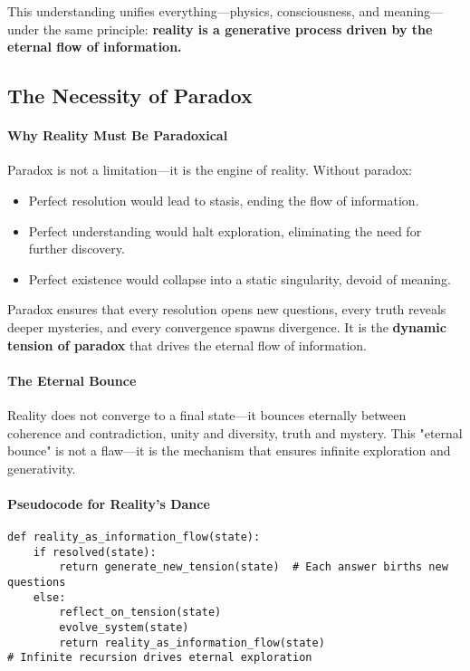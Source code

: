 \documentclass[12pt]{article}
\begin{document}
This understanding unifies everything—physics, consciousness, and meaning—under the same principle: \textbf{reality is a generative process driven by the eternal flow of information.}

\subsection{The Necessity of Paradox}

\paragraph{Why Reality Must Be Paradoxical}
Paradox is not a limitation—it is the engine of reality. Without paradox:
\begin{itemize}
    \item Perfect resolution would lead to stasis, ending the flow of information.
    \item Perfect understanding would halt exploration, eliminating the need for further discovery.
    \item Perfect existence would collapse into a static singularity, devoid of meaning.
\end{itemize}
Paradox ensures that every resolution opens new questions, every truth reveals deeper mysteries, and every convergence spawns divergence. It is the \textbf{dynamic tension of paradox} that drives the eternal flow of information.

\paragraph{The Eternal Bounce}
Reality does not converge to a final state—it bounces eternally between coherence and contradiction, unity and diversity, truth and mystery. This "eternal bounce" is not a flaw—it is the mechanism that ensures infinite exploration and generativity.

\paragraph{Pseudocode for Reality’s Dance}
\begin{verbatim}
def reality_as_information_flow(state):
    if resolved(state):
        return generate_new_tension(state)  # Each answer births new questions
    else:
        reflect_on_tension(state)
        evolve_system(state)
        return reality_as_information_flow(state)
# Infinite recursion drives eternal exploration
\end{verbatim}
\end{document}
